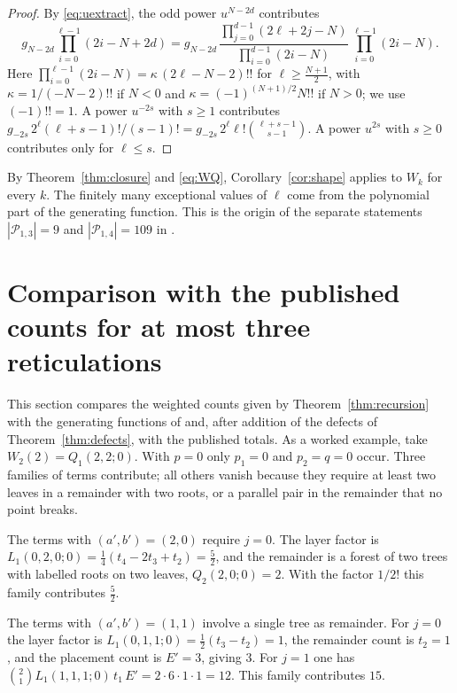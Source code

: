 \documentclass[11pt,a4paper]{article}
\theoremstyle{definition}
\newcommand{\cP}{\mathcal{P}}
\begin{document}
\begin{proof}
By \eqref{eq:uextract}, the odd power $u^{N-2d}$ contributes
\[
g_{N-2d}\prod_{i=0}^{\ell-1}(2i-N+2d)=g_{N-2d}\,\frac{\prod_{j=0}^{d-1}(2\ell+2j-N)}{\prod_{i=0}^{d-1}(2i-N)}\,\prod_{i=0}^{\ell-1}(2i-N).
\]
Here $\prod_{i=0}^{\ell-1}(2i-N)=\kappa\,(2\ell-N-2)!!$ for $\ell\ge\frac{N+1}{2}$, with $\kappa=1/(-N-2)!!$ if $N<0$ and $\kappa=(-1)^{(N+1)/2}N!!$ if $N>0$; we use $(-1)!!=1$. A power $u^{-2s}$ with $s\ge1$ contributes $g_{-2s}\,2^\ell(\ell+s-1)!/(s-1)!=g_{-2s}\,2^\ell\ell!\binom{\ell+s-1}{s-1}$. A power $u^{2s}$ with $s\ge0$ contributes only for $\ell\le s$.
\end{proof}

By Theorem~\ref{thm:closure} and \eqref{eq:WQ}, Corollary~\ref{cor:shape} applies to $W_k$ for every $k$. The finitely many exceptional values of $\ell$ come from the polynomial part of the generating function. This is the origin of the separate statements $|\cP_{1,3}|=9$ and $|\cP_{1,4}|=109$ in \cite{Yu26,YuZhang26}.



\section{Comparison with the published counts for at most three reticulations}\label{sec:verification}

This section compares the weighted counts given by Theorem~\ref{thm:recursion} with the generating functions of \cite{Mansouri22} and, after addition of the defects of Theorem~\ref{thm:defects}, with the published totals. As a worked example, take $W_2(2)=Q_1(2,2;0)$. With $p=0$ only $p_1=0$ and $p_2=q=0$ occur. Three families of terms contribute; all others vanish because they require at least two leaves in a remainder with two roots, or a parallel pair in the remainder that no point breaks.

The terms with $(a',b')=(2,0)$ require $j=0$. The layer factor is $L_1(0,2,0;0)=\tfrac14(t_4-2t_3+t_2)=\tfrac52$, and the remainder is a forest of two trees with labelled roots on two leaves, $Q_2(2,0;0)=2$. With the factor $1/2!$ this family contributes $\tfrac52$.

The terms with $(a',b')=(1,1)$ involve a single tree as remainder. For $j=0$ the layer factor is $L_1(0,1,1;0)=\tfrac12(t_3-t_2)=1$, the remainder count is $t_2=1$, and the placement count is $E'=3$, giving $3$. For $j=1$ one has $\binom21L_1(1,1,1;0)\,t_1\,E'=2\cdot6\cdot1\cdot1=12$. This family contributes $15$.
\end{document}
